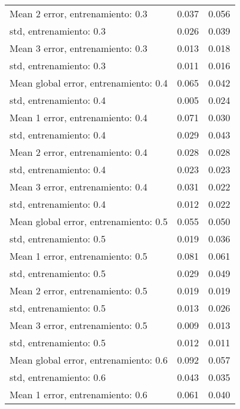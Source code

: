 \begin{longtable}{p{4cm}|p{1.5cm}|p{1.5cm}}
Mean 2 error, entrenamiento: 0.3      &              0.037 &        0.056 \\
std, entrenamiento: 0.3               &              0.026 &        0.039 \\
Mean 3 error, entrenamiento: 0.3      &              0.013 &        0.018 \\
std, entrenamiento: 0.3               &              0.011 &        0.016 \\
Mean global error, entrenamiento: 0.4 &              0.065 &        0.042 \\
std, entrenamiento: 0.4               &              0.005 &        0.024 \\
Mean 1 error, entrenamiento: 0.4      &              0.071 &        0.030 \\
std, entrenamiento: 0.4               &              0.029 &        0.043 \\
Mean 2 error, entrenamiento: 0.4      &              0.028 &        0.028 \\
std, entrenamiento: 0.4               &              0.023 &        0.023 \\
Mean 3 error, entrenamiento: 0.4      &              0.031 &        0.022 \\
std, entrenamiento: 0.4               &              0.012 &        0.022 \\
Mean global error, entrenamiento: 0.5 &              0.055 &        0.050 \\
std, entrenamiento: 0.5               &              0.019 &        0.036 \\
Mean 1 error, entrenamiento: 0.5      &              0.081 &        0.061 \\
std, entrenamiento: 0.5               &              0.029 &        0.049 \\
Mean 2 error, entrenamiento: 0.5      &              0.019 &        0.019 \\
std, entrenamiento: 0.5               &              0.013 &        0.026 \\
Mean 3 error, entrenamiento: 0.5      &              0.009 &        0.013 \\
std, entrenamiento: 0.5               &              0.012 &        0.011 \\
Mean global error, entrenamiento: 0.6 &              0.092 &        0.057 \\
std, entrenamiento: 0.6               &              0.043 &        0.035 \\
Mean 1 error, entrenamiento: 0.6      &              0.061 &        0.040 \\

\end{longtable}
